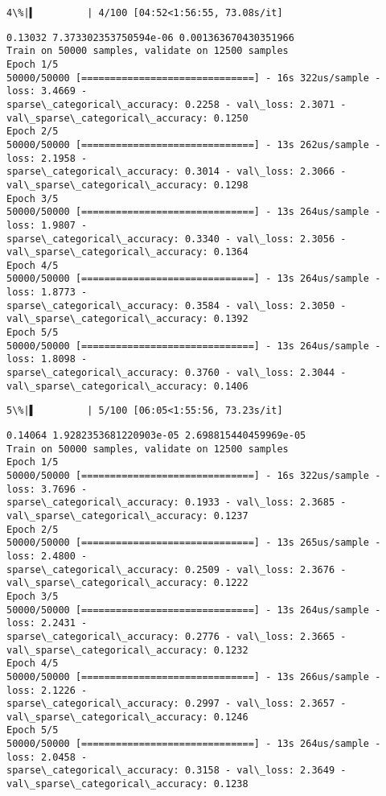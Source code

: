 \documentclass[11pt]{article}
\begin{document}
    \begin{Verbatim}[commandchars=\\\{\}]
  4\%|▍         | 4/100 [04:52<1:56:55, 73.08s/it]
    \end{Verbatim}

    \begin{Verbatim}[commandchars=\\\{\}]
0.13032 7.373302353750594e-06 0.001363670430351966
Train on 50000 samples, validate on 12500 samples
Epoch 1/5
50000/50000 [==============================] - 16s 322us/sample - loss: 3.4669 -
sparse\_categorical\_accuracy: 0.2258 - val\_loss: 2.3071 -
val\_sparse\_categorical\_accuracy: 0.1250
Epoch 2/5
50000/50000 [==============================] - 13s 262us/sample - loss: 2.1958 -
sparse\_categorical\_accuracy: 0.3014 - val\_loss: 2.3066 -
val\_sparse\_categorical\_accuracy: 0.1298
Epoch 3/5
50000/50000 [==============================] - 13s 264us/sample - loss: 1.9807 -
sparse\_categorical\_accuracy: 0.3340 - val\_loss: 2.3056 -
val\_sparse\_categorical\_accuracy: 0.1364
Epoch 4/5
50000/50000 [==============================] - 13s 264us/sample - loss: 1.8773 -
sparse\_categorical\_accuracy: 0.3584 - val\_loss: 2.3050 -
val\_sparse\_categorical\_accuracy: 0.1392
Epoch 5/5
50000/50000 [==============================] - 13s 264us/sample - loss: 1.8098 -
sparse\_categorical\_accuracy: 0.3760 - val\_loss: 2.3044 -
val\_sparse\_categorical\_accuracy: 0.1406
    \end{Verbatim}

    \begin{Verbatim}[commandchars=\\\{\}]
  5\%|▌         | 5/100 [06:05<1:55:56, 73.23s/it]
    \end{Verbatim}

    \begin{Verbatim}[commandchars=\\\{\}]
0.14064 1.9282353681220903e-05 2.698815440459969e-05
Train on 50000 samples, validate on 12500 samples
Epoch 1/5
50000/50000 [==============================] - 16s 322us/sample - loss: 3.7696 -
sparse\_categorical\_accuracy: 0.1933 - val\_loss: 2.3685 -
val\_sparse\_categorical\_accuracy: 0.1237
Epoch 2/5
50000/50000 [==============================] - 13s 265us/sample - loss: 2.4800 -
sparse\_categorical\_accuracy: 0.2509 - val\_loss: 2.3676 -
val\_sparse\_categorical\_accuracy: 0.1222
Epoch 3/5
50000/50000 [==============================] - 13s 264us/sample - loss: 2.2431 -
sparse\_categorical\_accuracy: 0.2776 - val\_loss: 2.3665 -
val\_sparse\_categorical\_accuracy: 0.1232
Epoch 4/5
50000/50000 [==============================] - 13s 266us/sample - loss: 2.1226 -
sparse\_categorical\_accuracy: 0.2997 - val\_loss: 2.3657 -
val\_sparse\_categorical\_accuracy: 0.1246
Epoch 5/5
50000/50000 [==============================] - 13s 264us/sample - loss: 2.0458 -
sparse\_categorical\_accuracy: 0.3158 - val\_loss: 2.3649 -
val\_sparse\_categorical\_accuracy: 0.1238
    \end{Verbatim}
\end{document}
